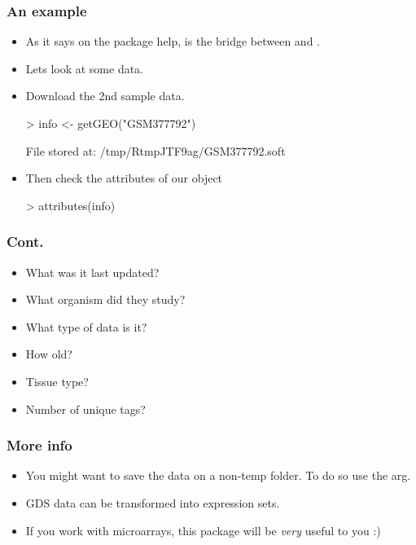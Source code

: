 \begin{frame}
  \frametitle{An example}
  \begin{itemize}
  \item As it says on the package help,  is the bridge between  and .
  \item Lets look at some  data.
  \item Download the 2nd sample data.
\begin{Schunk}
\begin{Sinput}
> info <- getGEO("GSM377792")
\end{Sinput}
\begin{Soutput}
File stored at: 
/tmp/RtmpJTF9ag/GSM377792.soft
\end{Soutput}
\end{Schunk}
  \item Then check the attributes of our  object
\begin{Schunk}
\begin{Sinput}
> attributes(info)
\end{Sinput}
\end{Schunk}
  \end{itemize}
\end{frame}

\begin{frame}[allowframebreaks]
  \frametitle{Cont.}
  \begin{itemize}
  \item What was it last updated?
  \item What organism did they study?
  \item What type of data is it?
  \item How old?
  \item Tissue type?
  \item Number of unique tags?
  \end{itemize}
\end{frame}

\begin{frame}[allowframebreaks]
  \frametitle{More info}
  \begin{itemize}
  \item You might want to save the data on a non-temp folder. To do so use the  arg.
  \item GDS data can be transformed into expression sets.
  \item If you work with microarrays, this package will be \emph{very} useful to you :)
  \end{itemize}
\end{frame}

